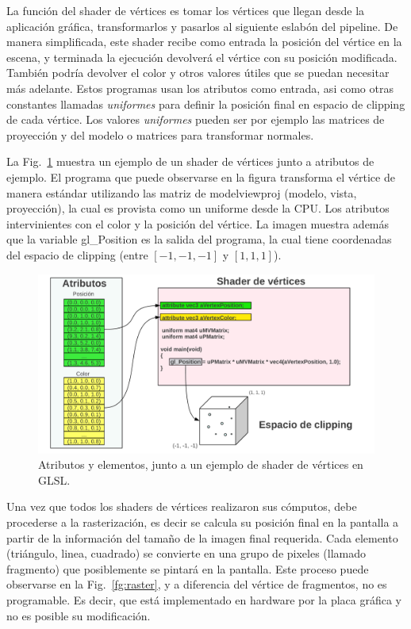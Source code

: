 La funci\'on del shader de vértices es tomar los v\'ertices que llegan desde la aplicaci\'on gr\'afica, transformarlos y pasarlos al siguiente eslab\'on del pipeline.
De manera simplificada, este shader recibe como entrada la posici\'on del v\'ertice en la escena, y terminada la ejecuci\'on devolver\'a el v\'ertice con su posici\'on modificada.
Tambi\'en podr\'ia devolver el color y otros valores \'utiles que se puedan necesitar m\'as adelante.
Estos programas usan los atributos como entrada, asi como otras constantes llamadas \emph{uniformes} para definir la posición final en espacio de clipping de cada vértice.
Los valores \emph{uniformes} pueden ser por ejemplo las matrices de proyección y del modelo o matrices para transformar normales. 

La Fig.~\ref{fg:vertexshader} muestra un ejemplo de un shader de vértices junto a atributos de ejemplo.
El programa que puede observarse en la figura transforma el vértice de manera estándar utilizando las matriz de modelviewproj (modelo, vista, proyección), la cual es provista como un uniforme desde la CPU.
Los atributos intervinientes con el color y la posición del vértice.
La imagen muestra además que la variable gl\_Position es la salida del programa, la cual tiene coordenadas del espacio de clipping (entre $[-1,-1,-1]$ y $[1,1,1]$).

\begin{figure}[h]
\begin{center}
\includegraphics[width=13cm]{figures/vertexshader}
\caption{Atributos y elementos, junto a un ejemplo de shader de vértices en GLSL.}
\end{center}
\label{fg:vertexshader}
\end{figure}

Una vez que todos los shaders de vértices realizaron sus cómputos, debe procederse a la rasterización, es decir se calcula su posición final en la pantalla a partir de la información del tamaño de la imagen final requerida.
Cada elemento (triángulo, linea, cuadrado) se convierte en una grupo de pixeles (llamado fragmento) que posiblemente se pintará en la pantalla.
Este proceso puede observarse en la Fig.~\ref{fg:raster}, y a diferencia del vértice de fragmentos, no es programable.
Es decir, que está implementado en hardware por la placa gráfica y no es posible su modificación.


